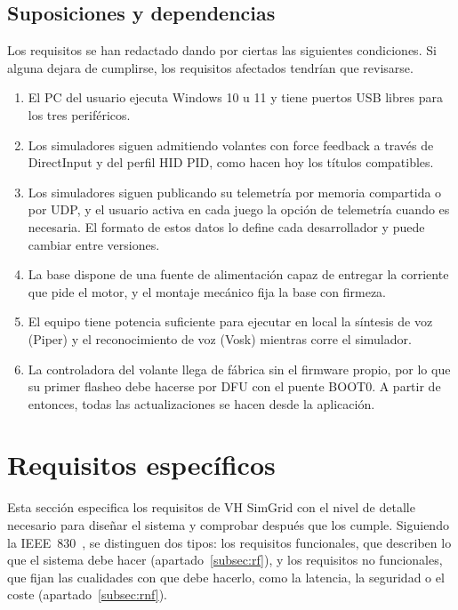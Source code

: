 \subsection{Suposiciones y dependencias}
\label{subsec:suposiciones}
Los requisitos se han redactado dando por ciertas las siguientes condiciones. Si alguna dejara de cumplirse, los requisitos afectados tendrían que revisarse.

\begin{enumerate}
	\item El PC del usuario ejecuta Windows 10 u 11 y tiene puertos USB libres para los tres periféricos.
	\item Los simuladores siguen admitiendo volantes con force feedback a través de DirectInput y del perfil HID PID, como hacen hoy los títulos compatibles.
	\item Los simuladores siguen publicando su telemetría por memoria compartida o por UDP, y el usuario activa en cada juego la opción de telemetría cuando es necesaria. El formato de estos datos lo define cada desarrollador y puede cambiar entre versiones.
	\item La base dispone de una fuente de alimentación capaz de entregar la corriente que pide el motor, y el montaje mecánico fija la base con firmeza.
	\item El equipo tiene potencia suficiente para ejecutar en local la síntesis de voz (Piper) y el reconocimiento de voz (Vosk) mientras corre el simulador.
	\item La controladora del volante llega de fábrica sin el firmware propio, por lo que su primer flasheo debe hacerse por DFU con el puente BOOT0. A partir de entonces, todas las actualizaciones se hacen desde la aplicación.
\end{enumerate}

\section{Requisitos específicos}
\label{sec:req-especificos}

Esta sección especifica los requisitos de VH SimGrid con el nivel de detalle necesario para diseñar el sistema y comprobar después que los cumple. Siguiendo la IEEE~830~\cite{ieee830}, se distinguen dos tipos: los requisitos funcionales, que describen lo que el sistema debe hacer (apartado~\ref{subsec:rf}), y los requisitos no funcionales, que fijan las cualidades con que debe hacerlo, como la latencia, la seguridad o el coste (apartado~\ref{subsec:rnf}).

